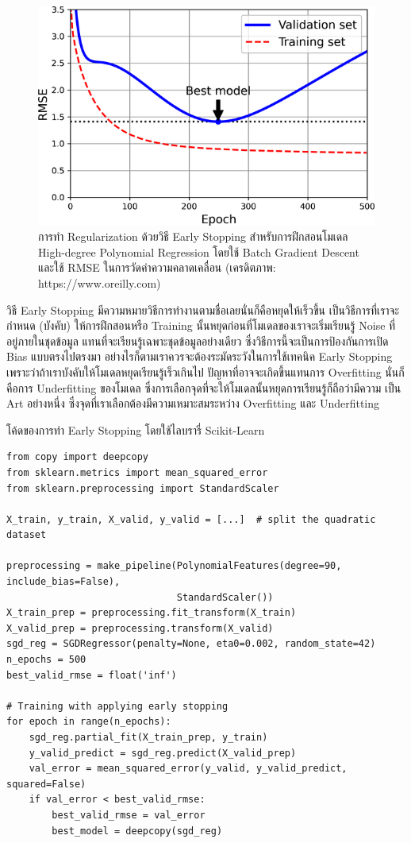\begin{figure}[H]
    \centering
    \includegraphics[width=0.9\linewidth]{fig/early_stopping.png}
    \caption{การทำ Regularization ด้วยวิธี Early Stopping สำหรับการฝึกสอนโมเดล High-degree Polynomial Regression 
    โดยใช้ Batch Gradient Descent และใช้ RMSE ในการวัดค่าความคลาดเคลื่อน (เครดิตภาพ: https://www.oreilly.com)}
    \label{fig:early_stopping}
\end{figure}

วิธี Early Stopping มีความหมายวิธีการทำงานตามชื่อเลยนั่นก็คือหยุดให้เร็วขึ้น เป็นวิธีการที่เราจะกำหนด (บังคับ) ให้การฝึกสอนหรือ Training 
นั้นหยุดก่อนที่โมเดลของเราจะเริ่มเรียนรู้ Noise ที่อยู่ภายในชุดข้อมูล แทนที่จะเรียนรู้เฉพาะชุดข้อมูลอย่างเดียว ซึ่งวิธีการนี้จะเป็นการป้องกันการเปิด 
Bias แบบตรงไปตรงมา อย่างไรก็ตามเราควรจะต้องระมัดระวังในการใช้เทคนิค Early Stopping เพราะว่าถ้าเราบังคับให้โมเดลหยุดเรียนรู้เร็วเกินไป
ปัญหาที่อาจจะเกิดขึ้นแทนการ Overfitting นั่นก็คือการ Underfitting ของโมเดล ซึ่งการเลือกจุดที่จะให้โมเดลนั้นหยุดการเรียนรู้ก็ถือว่ามีความ%
เป็น Art อย่างหนึ่ง ซึ่งจุดที่เราเลือกต้องมีความเหมาะสมระหว่าง Overfitting และ Underfitting

\noindent โค้ดของการทำ Early Stopping โดยใช้ไลบรารี่ Scikit-Learn

\begin{lstlisting}[style=MyPython]
from copy import deepcopy
from sklearn.metrics import mean_squared_error
from sklearn.preprocessing import StandardScaler

X_train, y_train, X_valid, y_valid = [...]  # split the quadratic dataset

preprocessing = make_pipeline(PolynomialFeatures(degree=90, include_bias=False),
                              StandardScaler())
X_train_prep = preprocessing.fit_transform(X_train)
X_valid_prep = preprocessing.transform(X_valid)
sgd_reg = SGDRegressor(penalty=None, eta0=0.002, random_state=42)
n_epochs = 500
best_valid_rmse = float('inf')

# Training with applying early stopping
for epoch in range(n_epochs):
    sgd_reg.partial_fit(X_train_prep, y_train)
    y_valid_predict = sgd_reg.predict(X_valid_prep)
    val_error = mean_squared_error(y_valid, y_valid_predict, squared=False)
    if val_error < best_valid_rmse:
        best_valid_rmse = val_error
        best_model = deepcopy(sgd_reg)
\end{lstlisting}


